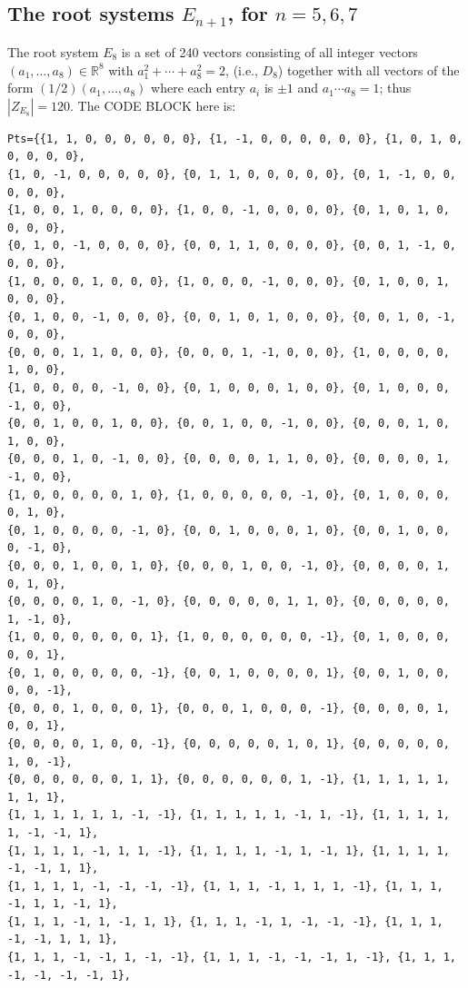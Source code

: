 \documentclass[12pt]{amsart}
\numberwithin{equation}{section}
\theoremstyle{definition}
\newcommand{\RR}{ \ensuremath{\mathbb{R}}}
\begin{document}
\subsection{The root systems \texorpdfstring{$E_{n+1}$}{E(n+1)}, for \texorpdfstring{$n=5,6,7$}{n=5,6,7}}
The root system $E_8$ is a set of 240 vectors consisting of all integer vectors $(a_1,\ldots,a_8)\in\RR^8$ with $a_1^2+\cdots+a_8^2=2$,
(i.e., $D_8$) together with all vectors of the form $(1/2)(a_1,\ldots,a_8)$ where each entry $a_i$ is $\pm1$ and $a_1\cdots a_8=1$;
thus $|Z_{E_8}|=120$.
The CODE BLOCK here is:
{\tiny
\begin{verbatim}
Pts={{1, 1, 0, 0, 0, 0, 0, 0}, {1, -1, 0, 0, 0, 0, 0, 0}, {1, 0, 1, 0, 0, 0, 0, 0}, 
{1, 0, -1, 0, 0, 0, 0, 0}, {0, 1, 1, 0, 0, 0, 0, 0}, {0, 1, -1, 0, 0, 0, 0, 0}, 
{1, 0, 0, 1, 0, 0, 0, 0}, {1, 0, 0, -1, 0, 0, 0, 0}, {0, 1, 0, 1, 0, 0, 0, 0}, 
{0, 1, 0, -1, 0, 0, 0, 0}, {0, 0, 1, 1, 0, 0, 0, 0}, {0, 0, 1, -1, 0, 0, 0, 0}, 
{1, 0, 0, 0, 1, 0, 0, 0}, {1, 0, 0, 0, -1, 0, 0, 0}, {0, 1, 0, 0, 1, 0, 0, 0}, 
{0, 1, 0, 0, -1, 0, 0, 0}, {0, 0, 1, 0, 1, 0, 0, 0}, {0, 0, 1, 0, -1, 0, 0, 0}, 
{0, 0, 0, 1, 1, 0, 0, 0}, {0, 0, 0, 1, -1, 0, 0, 0}, {1, 0, 0, 0, 0, 1, 0, 0}, 
{1, 0, 0, 0, 0, -1, 0, 0}, {0, 1, 0, 0, 0, 1, 0, 0}, {0, 1, 0, 0, 0, -1, 0, 0}, 
{0, 0, 1, 0, 0, 1, 0, 0}, {0, 0, 1, 0, 0, -1, 0, 0}, {0, 0, 0, 1, 0, 1, 0, 0}, 
{0, 0, 0, 1, 0, -1, 0, 0}, {0, 0, 0, 0, 1, 1, 0, 0}, {0, 0, 0, 0, 1, -1, 0, 0}, 
{1, 0, 0, 0, 0, 0, 1, 0}, {1, 0, 0, 0, 0, 0, -1, 0}, {0, 1, 0, 0, 0, 0, 1, 0}, 
{0, 1, 0, 0, 0, 0, -1, 0}, {0, 0, 1, 0, 0, 0, 1, 0}, {0, 0, 1, 0, 0, 0, -1, 0}, 
{0, 0, 0, 1, 0, 0, 1, 0}, {0, 0, 0, 1, 0, 0, -1, 0}, {0, 0, 0, 0, 1, 0, 1, 0}, 
{0, 0, 0, 0, 1, 0, -1, 0}, {0, 0, 0, 0, 0, 1, 1, 0}, {0, 0, 0, 0, 0, 1, -1, 0}, 
{1, 0, 0, 0, 0, 0, 0, 1}, {1, 0, 0, 0, 0, 0, 0, -1}, {0, 1, 0, 0, 0, 0, 0, 1}, 
{0, 1, 0, 0, 0, 0, 0, -1}, {0, 0, 1, 0, 0, 0, 0, 1}, {0, 0, 1, 0, 0, 0, 0, -1}, 
{0, 0, 0, 1, 0, 0, 0, 1}, {0, 0, 0, 1, 0, 0, 0, -1}, {0, 0, 0, 0, 1, 0, 0, 1}, 
{0, 0, 0, 0, 1, 0, 0, -1}, {0, 0, 0, 0, 0, 1, 0, 1}, {0, 0, 0, 0, 0, 1, 0, -1}, 
{0, 0, 0, 0, 0, 0, 1, 1}, {0, 0, 0, 0, 0, 0, 1, -1}, {1, 1, 1, 1, 1, 1, 1, 1}, 
{1, 1, 1, 1, 1, 1, -1, -1}, {1, 1, 1, 1, 1, -1, 1, -1}, {1, 1, 1, 1, 1, -1, -1, 1}, 
{1, 1, 1, 1, -1, 1, 1, -1}, {1, 1, 1, 1, -1, 1, -1, 1}, {1, 1, 1, 1, -1, -1, 1, 1}, 
{1, 1, 1, 1, -1, -1, -1, -1}, {1, 1, 1, -1, 1, 1, 1, -1}, {1, 1, 1, -1, 1, 1, -1, 1}, 
{1, 1, 1, -1, 1, -1, 1, 1}, {1, 1, 1, -1, 1, -1, -1, -1}, {1, 1, 1, -1, -1, 1, 1, 1}, 
{1, 1, 1, -1, -1, 1, -1, -1}, {1, 1, 1, -1, -1, -1, 1, -1}, {1, 1, 1, -1, -1, -1, -1, 1}, 

\end{verbatim}}
\end{document}
